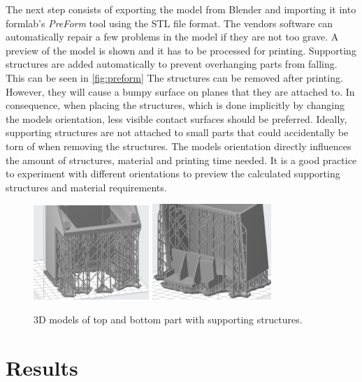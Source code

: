 \documentclass[12pt]{article}
\begin{document}
The next step consists of exporting the model from Blender and importing it into formlab's \textit{PreForm} tool
using the STL file format. The vendors software can automatically repair a few problems in the model if they are not too grave.
A preview of the model is shown and it has to be processed for printing.
Supporting structures are added automatically to prevent overhanging parts from falling. This can be seen in \autoref{fig:preform}
The structures can be removed after printing. 
However, they will cause a bumpy surface on planes that they are attached to.
In consequence, when placing the structures, which is done implicitly by changing the models orientation,
less visible contact surfaces should be preferred.
Ideally, supporting structures are not attached to small parts that could accidentally be torn of when removing the structures.
The models orientation directly influences the amount of structures, material and printing time needed.
It is a good practice to experiment with different orientations to preview the calculated supporting structures and material requirements.

\begin{figure}[H]
\centering
\includegraphics[width=0.39\textwidth]{./images/bottom-preform.png}
\includegraphics[width=0.4\textwidth]{./images/top-preform.png}
\caption{3D models of top and bottom part with supporting structures.}
\label{fig:preform}
\end{figure}


\section{Results}
\end{document}
